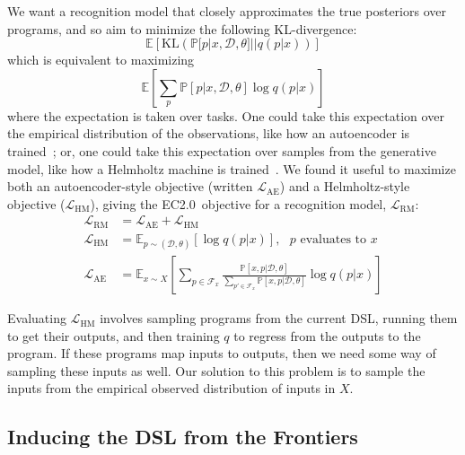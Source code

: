 \documentclass{article}
\newcommand{\system}{EC2.0~}
\newcommand{\expect}{\mathds{E}} %
\newcommand{\probability}{\mathds{P}} %
\begin{document}
We want a recognition model that closely approximates the true posteriors over programs, and so aim to minimize the following KL-divergence:
\begin{equation*}
  \expect\left[\text{KL}\left(\probability[p|x,\mathcal{D},\theta]||q(p|x) \right) \right]
\end{equation*}
which is equivalent to maximizing
$$
  \expect\left[\sum_p\probability[p|x,\mathcal{D},\theta]\log q(p|x) \right]
$$
  where the expectation is taken over tasks. One could take this expectation
  over the empirical distribution of the observations,
  like how an autoencoder is trained~\cite{hinton2006reducing}; or, one could take this expectation over samples from the generative model, like how a Helmholtz machine is trained~\cite{dayan1995helmholtz}.
  We found it useful to maximize both an autoencoder-style objective (written $\mathcal{L}_{\text{AE}}$) and a Helmholtz-style objective ($\mathcal{L}_{\text{HM}}$), giving the \system objective for a recognition model, $\mathcal{L}_{\text{RM}}$:
  \begin{align}
  \mathcal{L}_{\text{RM}}& = \mathcal{L}_\text{AE} + \mathcal{L}_\text{HM}\\
  \mathcal{L}_{\text{HM}}& = \expect_{p\sim(\mathcal{D},\theta) }\left[\log q(p|x)\right],\text{ $p$ evaluates to $x$}\nonumber\\
  \mathcal{L}_{\text{AE}}& = \expect_{x\sim X}\left[\sum_{p\in \mathcal{F}_x}
    \frac{\probability\left[x,p|\mathcal{D},\theta \right]}{\sum_{p'\in \mathcal{F}_x}\probability\left[x,p|\mathcal{D},\theta \right]}\log q(p|x)\right]\nonumber
  \end{align}

  Evaluating $\mathcal{L}_{\text{HM}}$ involves sampling programs from
  the current DSL, running them to get their outputs,
  and then training $q$ to regress from the outputs to the program.
  If these programs map inputs to outputs,
  then we need some way of sampling these inputs as well.
  Our solution to this problem is to sample the inputs
  from the empirical observed distribution of inputs in $X$.

\subsection{Inducing the DSL from the Frontiers}\label{grammarInductionSection}
\end{document}
